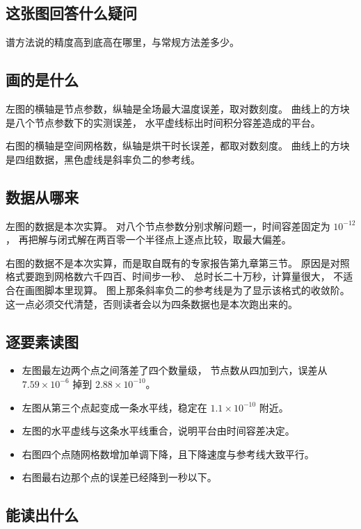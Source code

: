 \documentclass[11pt,a4paper]{article}
\begin{document}
\subsection{这张图回答什么疑问}

谱方法说的精度高到底高在哪里，与常规方法差多少。

\subsection{画的是什么}

左图的横轴是节点参数，纵轴是全场最大温度误差，取对数刻度。
曲线上的方块是八个节点参数下的实测误差，
水平虚线标出时间积分容差造成的平台。

右图的横轴是空间网格数，纵轴是烘干时长误差，都取对数刻度。
曲线上的方块是四组数据，黑色虚线是斜率负二的参考线。

\subsection{数据从哪来}

左图的数据是本次实算。
对八个节点参数分别求解问题一，时间容差固定为 $10^{-12}$，
再把解与闭式解在两百零一个半径点上逐点比较，取最大偏差。

右图的数据不是本次实算，而是取自既有的专家报告第九章第三节。
原因是对照格式要跑到网格数六千四百、时间步一秒、
总时长二十万秒，计算量很大，
不适合在画图脚本里现算。
图上那条斜率负二的参考线是为了显示该格式的收敛阶。
这一点必须交代清楚，否则读者会以为四条数据也是本次跑出来的。

\subsection{逐要素读图}

\begin{itemize}[leftmargin=1.6em]
\item 左图最左边两个点之间落差了四个数量级，
      节点数从四加到六，误差从 $7.59\times10^{-6}$ 掉到 $2.88\times10^{-10}$。
\item 左图从第三个点起变成一条水平线，稳定在 $1.1\times10^{-10}$ 附近。
\item 左图的水平虚线与这条水平线重合，说明平台由时间容差决定。
\item 右图四个点随网格数增加单调下降，且下降速度与参考线大致平行。
\item 右图最右边那个点的误差已经降到一秒以下。
\end{itemize}

\subsection{能读出什么}
\end{document}
